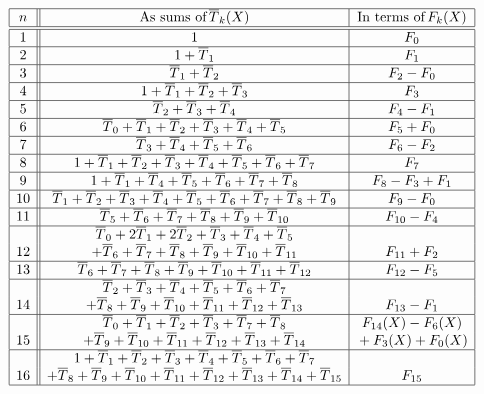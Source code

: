 \documentclass[11pt, a4paper]{amsart}
\theoremstyle{definition}
\newcommand\Pg{\overline{P}}
\newcommand\TT{\overline{T}}
\numberwithin{equation}{section}
\begin{document}
\begin{table}[ht]
\caption{\emph{Expressions for $\Pg_n (X)$ in terms of $\TT_k(X)$ and of $F_k(X)$}}\label{table-PPTTF}
\renewcommand\arraystretch{1.30}
\noindent\[
\begin{array}{|c||c|c|}
\hline
n &  \textrm{As sums of} \, \TT_k(X) & \textrm{In terms of}\, F_k(X) \\
\hline\hline
1 & 1 & F_0 \\ 
\hline
2 &  1 + \TT_1 & F_1 \\
\hline
3 &  \TT_1 + \TT_2 & F_2 - F_0 \\ 
\hline
4 &  1 + \TT_1 + \TT_2 + \TT_3 & F_3 \\ 
\hline
5 &  \TT_2 + \TT_3 + \TT_4 & F_4 - F_1 \\ 
\hline
6 &  \TT_0 + \TT_1 + \TT_2 + \TT_3 + \TT_4 + \TT_5  & F_5 + F_0 \\
\hline
7 &  \TT_3 + \TT_4 + \TT_5 + \TT_6 & F_6 - F_2 \\ 
\hline
8 &  1 + \TT_1 + \TT_2 + \TT_3 + \TT_4 + \TT_5 + \TT_6 + \TT_7  & F_7 \\ 
\hline
9 &  1 + \TT_1 + \TT_4 + \TT_5 + \TT_6 + \TT_7 + \TT_8 & F_8 - F_3 + F_1 \\
\hline
10 &  \TT_1 + \TT_2 + \TT_3 + \TT_4 + \TT_5 + \TT_6 + \TT_7  + \TT_8 + \TT_9 & F_9 - F_0 \\
\hline
11 &  \TT_5 + \TT_6 + \TT_7 + \TT_8 + \TT_9 + \TT_{10} & F_{10} - F_4  \\
\hline
&  \TT_0 + 2 \TT_1 + 2\TT_2 + \TT_3 + \TT_4 + \TT_5 & \\
12 &  + \TT_6 + \TT_7 + \TT_8 + \TT_9 + \TT_{10} +  \TT_{11} &  F_{11} + F_2 \\
\hline
13 &   \TT_6 + \TT_7 + \TT_8 + \TT_9 + \TT_{10} +  \TT_{11} +  \TT_{12} &  F_{12} - F_5 \\
\hline
&  \TT_2 + \TT_3 + \TT_4 + \TT_5 +  \TT_6 + \TT_7& \\
14 &  + \TT_8 + \TT_9 + \TT_{10} +  \TT_{11} +  \TT_{12} +  \TT_{13} &  F_{13} - F_1 \\
\hline
&  \TT_0 + \TT_1 + \TT_2 + \TT_3  + \TT_7 + \TT_8 & F_{14}(X) - F_6(X) \\
15 &   + \TT_9 + \TT_{10} +  \TT_{11} +  \TT_{12} +  \TT_{13} +  \TT_{14} &   {}+ F_3(X) + F_0(X)  \\
\hline
&  1 + \TT_1 + \TT_2 + \TT_3 + \TT_4 + \TT_5 +  \TT_6 + \TT_7 & \\
16 &  + \TT_8 + \TT_9 + \TT_{10} +  \TT_{11}  +  \TT_{12}  +  \TT_{13}  +  \TT_{14}  +  \TT_{15} &  F_{15}  \\
\hline
\end{array}
\]
\end{table}
\end{document}
